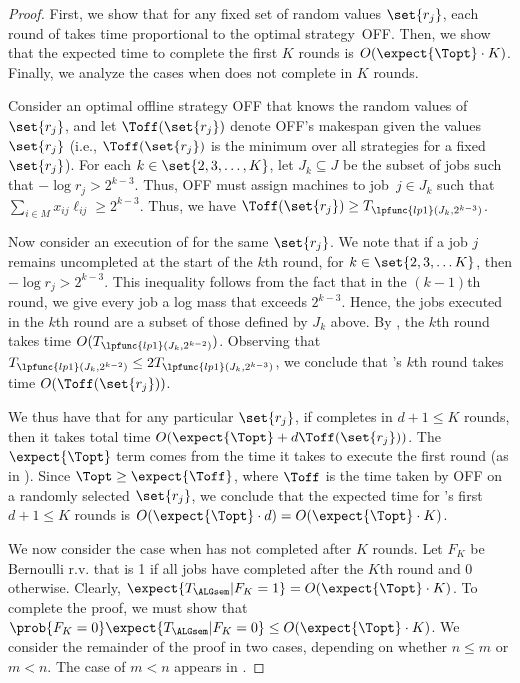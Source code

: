 \begin{proof}
  First, we show that for any fixed set of random values $\set{r_j}$,
  each round of \ALGsem takes time proportional to the optimal
  strategy~OFF.  Then, we show that the expected time to complete 
  the first $K$ rounds is $O(\expect{\Topt} \cdot K)$.  Finally, we analyze the
  cases when \ALGsem does not complete in $K$ rounds.
  
  Consider an optimal offline strategy OFF that knows the random
  values of $\set{r_j}$, and let $\Toff(\set{r_j})$ denote OFF's
  makespan given the values $\set{r_j}$ (i.e., $\Toff(\set{r_j})$ is
  the minimum over all strategies for a fixed $\set{r_j}$).
  For each $k\in\set{2,3,\ldots,K}$, let $J_k \subseteq J$ be the
  subset of jobs such that $-\log r_j > 2^{k-3}$.  Thus, OFF must
  assign machines to job~$j\in J_k$ such that
  $\sum_{i\in M} x_{ij} \ell_{ij} \geq 2^{k-3}$. Thus,  we have
  $\Toff(\set{r_j}) \geq T_{\lpfunc{lp1}(J_k,2^{k-3})}$.
  

  Now consider an execution of \ALGsem for the same $\set{r_j}$.  We
  note that if a job $j$ remains uncompleted at the start of the $k$th
  round, for $k\in\set{2,3,\ldots K}$, then $-\log r_j > 2^{k-3}$.
  This inequality follows from the fact that in the $(k-1)$th round,
  we give every job a log mass that exceeds $2^{k-3}$.  Hence,
  the jobs executed in the $k$th round are a subset of those
  defined by $J_k$ above.  By , the $k$th
  round takes time $O(T_{\lpfunc{lp1}(J_k,2^{k-2})})$.  Observing that
  $T_{\lpfunc{lp1}(J_k,2^{k-2})} \leq 2T_{\lpfunc{lp1}(J_k,2^{k-3})}$,
  we conclude that \ALGsem's $k$th round takes time
  $O(\Toff(\set{r_j}))$.
  
  We thus have that for any particular $\set{r_j}$, if \ALGsem
  completes in $d+1\leq K$ rounds, then it takes total time
  $O(\expect{\Topt} + d\Toff(\set{r_j}))$.  The $\expect{\Topt}$ term
  comes from the time it takes to execute the first round (as
  in ).  Since $\Topt \geq \expect{\Toff}$, where $\Toff$ is
  the time taken by OFF on a randomly selected $\set{r_j}$, we
  conclude that the expected time for \ALGsem's first $d+1 \leq K$
  rounds is $O(\expect{\Topt}\cdot d) = O(\expect{\Topt}\cdot K)$.
  
  We now consider the case when \ALGsem has not completed after $K$
  rounds.  Let $F_K$ be Bernoulli r.v. that is 1 if all jobs have
  completed after the $K$th round and 0 otherwise. Clearly,
  $\expect{T_{\ALGsem} | F_K = 1} = O(\expect{\Topt} \cdot K)$.  To
  complete the proof, we must show that $\prob{F_K = 0} \expect{T_{\ALGsem}
  | F_K = 0 } \leq O(\expect{\Topt} \cdot K)$.  We consider the remainder of
  the proof in two cases, depending on whether $n \leq m$ or $m < n$.
  The case of $m<n$ appears in .
  

\end{proof}
